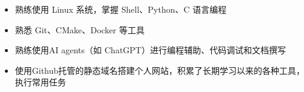 \documentclass[zh]{resume}
\begin{document}
\begin{itemize}
  \item 熟练使用 Linux 系统，掌握 Shell、Python、C 语言编程
  \item 熟悉 Git、CMake、Docker 等工具
  \item 熟练使用AI agents（如 ChatGPT）进行编程辅助、代码调试和文档撰写
  \item 使用Github托管的静态域名搭建个人网站，积累了长期学习以来的各种工具，执行常用任务
\end{itemize}
\end{document}
